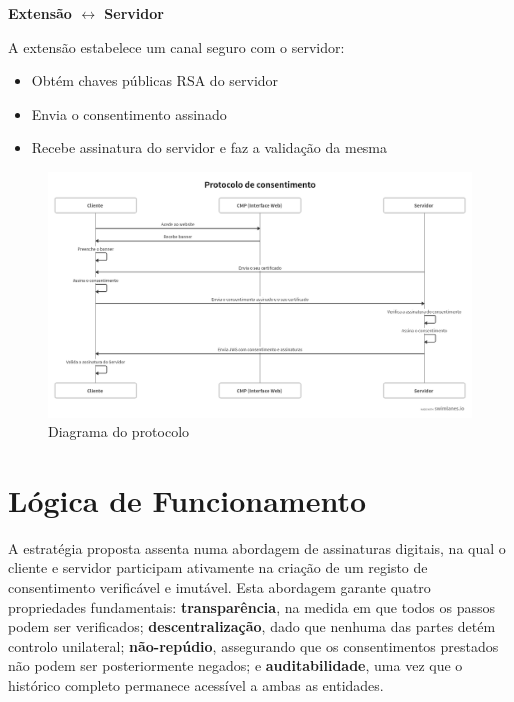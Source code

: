 \textbf{Extensão $\leftrightarrow$ Servidor}

A extensão estabelece um canal seguro com o servidor:
\begin{itemize}
    \item Obtém chaves públicas RSA do servidor
    \item Envia o consentimento assinado
    \item Recebe assinatura do servidor e faz a validação da mesma
\end{itemize}

\begin{figure}[h]
\begin{center}
\includegraphics[width=1\textwidth]{images/swimlanes.png}
\end{center}
\caption{Diagrama do protocolo}
\label{fig:swimlane1}
\end{figure}

\newpage

\section{Lógica de Funcionamento}

A estratégia proposta assenta numa abordagem de assinaturas digitais, na qual o cliente e servidor participam ativamente na criação de um registo de consentimento verificável e imutável. Esta abordagem garante quatro propriedades fundamentais: \textbf{transparência}, na medida em que todos os passos podem ser verificados; \textbf{descentralização}, dado que nenhuma das partes detém controlo unilateral; \textbf{não-repúdio}, assegurando que os consentimentos prestados não podem ser posteriormente negados; e \textbf{auditabilidade}, uma vez que o histórico completo permanece acessível a ambas as entidades.

